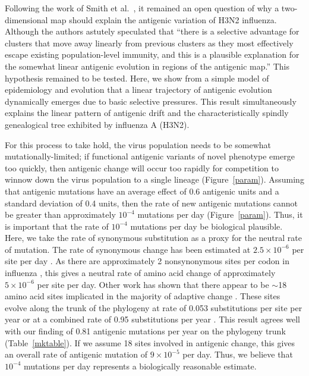 \documentclass[11pt,oneside,letterpaper]{article}
\begin{document}
Following the work of Smith et al.\ \cite{Smith04}, it remained an open question of why a two-dimensional map should explain the antigenic variation of H3N2 influenza.  Although the authors astutely speculated that ``there is a selective advantage for clusters that move away linearly from previous clusters as they most effectively escape existing population-level immunity, and this is a plausible explanation for the somewhat linear antigenic evolution in regions of the antigenic map.''  This hypothesis remained to be tested.  Here, we show from a simple model of epidemiology and evolution that a linear trajectory of antigenic evolution dynamically emerges due to basic selective pressures.  This result simultaneously explains the linear pattern of antigenic drift \cite{Smith04} and the characteristically spindly genealogical tree \cite{Fitch97} exhibited by influenza A (H3N2).  

For this process to take hold, the virus population needs to be somewhat mutationally-limited; if functional antigenic variants of novel phenotype emerge too quickly, then antigenic change will occur too rapidly for competition to winnow down the virus population to a single lineage (Figure~\ref{param}).  Assuming that antigenic mutations have an average effect of 0.6 antigenic units and a standard deviation of 0.4 units, then the rate of new antigenic mutations cannot be greater than approximately $10^{-4}$ mutations per day (Figure~\ref{param}).  Thus, it is important that the rate of $10^{-4}$ mutations per day be biological plausible.  Here, we take the rate of synonymous substitution as a proxy for the neutral rate of mutation.  The rate of synonymous change has been estimated at $2.5 \times 10^{-6}$ per site per day \cite{OBrien09}.  As there are approximately 2 nonsynonymous sites per codon in influenza \cite{Yang00}, this gives a neutral rate of amino acid change of approximately $5 \times 10^{-6}$ per site per day.  Other work has shown that there appear to be $\sim$18 amino acid sites implicated in the majority of adaptive change \cite{Bush99MBE}.  These sites evolve along the trunk of the phylogeny at rate of 0.053 substitutions per site per year or at a combined rate of 0.95 substitutions per year \cite{Ferguson03}.  This result agrees well with our finding of 0.81 antigenic mutations per year on the phylogeny trunk (Table~\ref{mktable}).  If we assume 18 sites involved in antigenic change, this gives an overall rate of antigenic mutation of $9 \times 10^{-5}$ per day.  Thus, we believe that $10^{-4}$ mutations per day represents a biologically reasonable estimate.  
\end{document}
